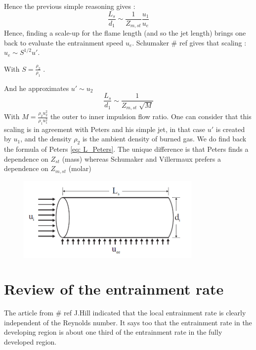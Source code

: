 Hence the previous simple reasoning gives :
\begin{equation}
\frac{L_{s}}{d_{1}}\sim  \frac{1}{Z_{m,st}}\frac{u_{1}}{u_{e}}
\end{equation}
Hence, finding a scale-up for the flame length (and so the jet length) brings one back to evaluate the entrainment speed $u_{e}$. Schumaker \# ref gives that scaling :
$u_{e}\sim S^{1/2} u'$.

With $S=\frac{\rho_{2}}{\rho_{1}}$ .

And he approximates $u'\sim u_{2}$
\begin{equation}
\frac{L_{s}}{d_{1}}\sim  \frac{1}{Z_{m,st}\sqrt[]{M}}
\end{equation}
With $M=\frac{\rho_{2} u_{2}^2}{\rho_{1}u_{1}^2}$ the outer to inner impulsion flow ratio.
One can consider that this scaling is in agreement with Peters and his simple jet, in that case $u'$ is created by $u_{1}$, and the density $\rho_{2}$ is the ambient density of burned gas. We do find back the formula of Peters \ref{eq: L_Peters}. The unique difference is that Peters finds a dependence on $Z_{st}$ (mass) whereas Schumaker and Villermaux prefers a dependence on $Z_{m,st}$ (molar)

\begin{figure}[h!]
  \centering
\includegraphics[width=0.8\textwidth]{fig/Schumaker.PNG}
 \label{Schema_Schumaker}
\end{figure}
\section{Review of the entrainment rate}
The article from \# ref J.Hill indicated that the local entrainment rate is clearly independent of the Reynolds number. It says too that the entrainment rate in the developing region is about one third of the entrainment rate in the fully developed region. 




